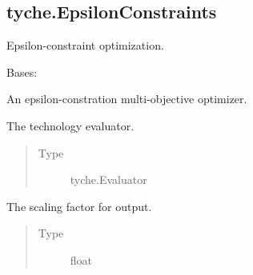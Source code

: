 \documentclass[letterpaper,10pt,english]{sphinxmanual}
\begin{document}
\subsection{tyche.EpsilonConstraints}
\label{\detokenize{tyche:module-tyche.EpsilonConstraints}}\label{\detokenize{tyche:tyche-epsilonconstraints}}\label{\detokenize{tyche:sec-epsconstraint}}
Epsilon-constraint optimization.

\begin{fulllineitems}
\label{\detokenize{tyche:tyche.EpsilonConstraints.EpsilonConstraintOptimizer}}
Bases: 

An epsilon-constration multi-objective optimizer.

\begin{fulllineitems}
\label{\detokenize{tyche:tyche.EpsilonConstraints.EpsilonConstraintOptimizer.evaluator}}
The technology evaluator.
\begin{quote}\begin{description}
\item[{Type}] \leavevmode
tyche.Evaluator

\end{description}\end{quote}

\end{fulllineitems}


\begin{fulllineitems}
\label{\detokenize{tyche:tyche.EpsilonConstraints.EpsilonConstraintOptimizer.scale}}
The scaling factor for output.
\begin{quote}\begin{description}
\item[{Type}] \leavevmode
float


\end{description}
\end{quote}
\end{fulllineitems}
\end{fulllineitems}
\end{document}
